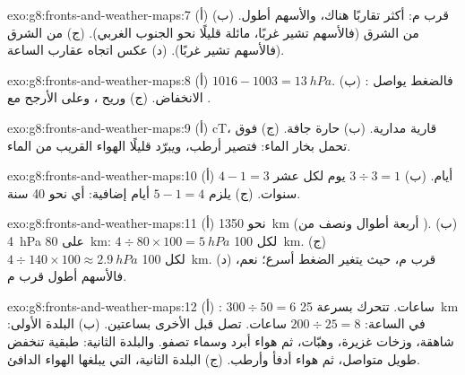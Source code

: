 \begin{solution}{exo:g8:fronts-and-weather-maps:7}
(أ) قرب م:  أكثر تقاربًا هناك، والأسهم
أطول. (ب) من الشرق (فالأسهم تشير غربًا، مائلة قليلًا نحو
الجنوب الغربي). (ج) من الشرق (فالأسهم تشير غربًا). (د)
عكس اتجاه عقارب الساعة.
\end{solution}

\begin{solution}{exo:g8:fronts-and-weather-maps:8}
(أ) $1016 - 1003 = \qty{13}{hPa}$. (ب) : فالضغط يواصل
الانخفاض. (ج)  وريح ، وعلى الأرجح مع .
\end{solution}

\begin{solution}{exo:g8:fronts-and-weather-maps:9}
(أ) cT، قارية مدارية. (ب) حارة جافة. (ج) فوق  تحمل بخار
الماء: فتصير أرطب، ويبرّد  قليلًا الهواء القريب من
الماء.
\end{solution}

\begin{solution}{exo:g8:fronts-and-weather-maps:10}
(أ) $4 - 1 = 3$ أيام. (ب) $3 \div 3 = 1$ يوم لكل عشر سنوات. (ج) يلزم
$5 - 1 = 4$ أيام إضافية: أي نحو 40 سنة.
\end{solution}

\begin{solution}{exo:g8:fronts-and-weather-maps:11}
(أ) نحو \qty{1350}{km} (أربعة أطوال ونصف من ). (ب) \qty{4}{hPa}
على \qty{80}{km}: $4 \div 80 \times 100 = \qty{5}{hPa}$ لكل
\qty{100}{km}. (ج) $4 \div 140 \times 100 \approx \qty{2.9}{hPa}$ لكل
\qty{100}{km}. (د) قرب م، حيث يتغير الضغط أسرع؛ نعم، فالأسهم
أطول قرب م.
\end{solution}

\begin{solution}{exo:g8:fronts-and-weather-maps:12}
(أ) : $300 \div 50 = 6$ ساعات.  تتحرك بسرعة
\qty{25}{km} في الساعة: $200 \div 25 = 8$ ساعات.  تصل
قبل الأخرى بساعتين. (ب) البلدة الأولى:  شاهقة، وزخات غزيرة، وهبّات،
ثم هواء أبرد وسماء تصفو. والبلدة الثانية:  طبقية تنخفض
 طويل متواصل، ثم هواء أدفأ وأرطب. (ج) البلدة الثانية،
التي يبلغها الهواء الدافئ.
\end{solution}

